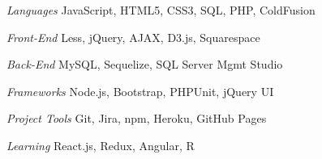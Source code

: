\begin{minipage}[t]{0.53\textwidth}
\begin{cvskills}

  \cvskill
    {\textit{Languages}} %
    {JavaScript, HTML5, CSS3, SQL, PHP, ColdFusion} %


 \cvskill
    {\textit{Front-End}} %
    {Less, jQuery, AJAX, D3.js, Squarespace} %


  \cvskill
    {\textit{Back-End}} %
    {MySQL, Sequelize, SQL Server Mgmt Studio} %

 
\end{cvskills}
\end{minipage}%
\begin{minipage}[t]{0.47\textwidth}
\begin{cvskills}

  \cvskill
    {\textit{Frameworks}} %
    {Node.js, Bootstrap, PHPUnit, jQuery UI} %


  \cvskill
    {\textit{Project Tools}} %
    {Git, Jira, npm, Heroku, GitHub Pages} %


  \cvskill
    {\textit{Learning}} %
    {React.js, Redux, Angular, R} %

\end{cvskills}
\end{minipage}

%
